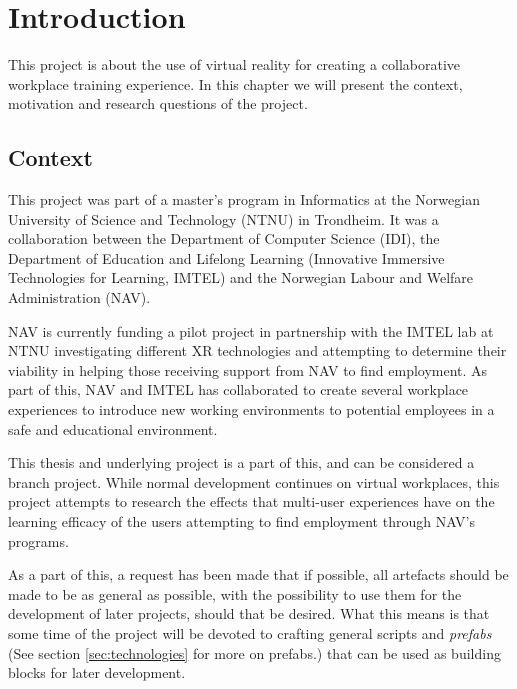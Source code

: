 
\chapter{Introduction}

This project is about the use of virtual reality for creating a collaborative workplace training experience. In this chapter we will present the context, motivation and research questions of the project. 

\section{Context}
\label{section:context}
This project was part of a master's program in Informatics at the Norwegian University of Science and Technology (NTNU) in Trondheim. It was a collaboration between the Department of Computer Science (IDI), the Department of Education and Lifelong Learning (Innovative Immersive Technologies for Learning, IMTEL) and the Norwegian Labour and Welfare Administration (NAV). 

NAV is currently funding a pilot project in partnership with the IMTEL lab at NTNU investigating different XR technologies and attempting to determine their viability in helping those receiving support from NAV to find employment. As part of this, NAV and IMTEL has collaborated to create several workplace experiences to introduce new working environments to potential employees in a safe and educational environment.

This thesis and underlying project is a part of this, and can be considered a branch project. While normal development continues on virtual workplaces, this project attempts to research the effects that multi-user experiences have on the learning efficacy of the users attempting to find employment through NAV's programs. 

As a part of this, a request has been made that if possible, all artefacts should be made to be as general as possible, with the possibility to use them for the development of later projects, should that be desired. What this means is that some time of the project will be devoted to crafting general scripts and \textit{prefabs} (See section \ref{sec:technologies} for more on prefabs.) that can be used as building blocks for later development.


